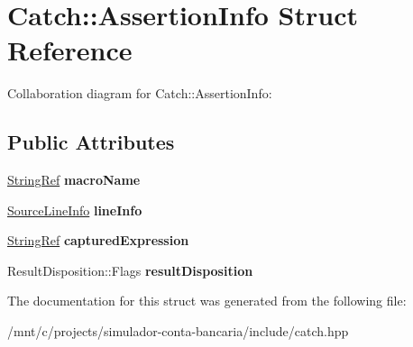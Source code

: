 \hypertarget{structCatch_1_1AssertionInfo}{}\section{Catch\+:\+:Assertion\+Info Struct Reference}
\label{structCatch_1_1AssertionInfo}


Collaboration diagram for Catch\+:\+:Assertion\+Info\+:
\subsection*{Public Attributes}
\begin{DoxyCompactItemize}
\item 
\mbox{\label{structCatch_1_1AssertionInfo_aaf3fbb9f1fe09c879ba3d877584e3056}} 
\hyperlink{classCatch_1_1StringRef}{String\+Ref} {\bfseries macro\+Name}
\item 
\mbox{\label{structCatch_1_1AssertionInfo_a17bdbb404ba12658034f833be2f4c3e7}} 
\hyperlink{structCatch_1_1SourceLineInfo}{Source\+Line\+Info} {\bfseries line\+Info}
\item 
\mbox{\label{structCatch_1_1AssertionInfo_accd36744b4acaa3a691a72df0b42190f}} 
\hyperlink{classCatch_1_1StringRef}{String\+Ref} {\bfseries captured\+Expression}
\item 
\mbox{\label{structCatch_1_1AssertionInfo_a60353b3632ab2f827162f2b2d6911073}} 
Result\+Disposition\+::\+Flags {\bfseries result\+Disposition}
\end{DoxyCompactItemize}


The documentation for this struct was generated from the following file\+:\begin{DoxyCompactItemize}
\item 
/mnt/c/projects/simulador-\/conta-\/bancaria/include/catch.\+hpp\end{DoxyCompactItemize}
